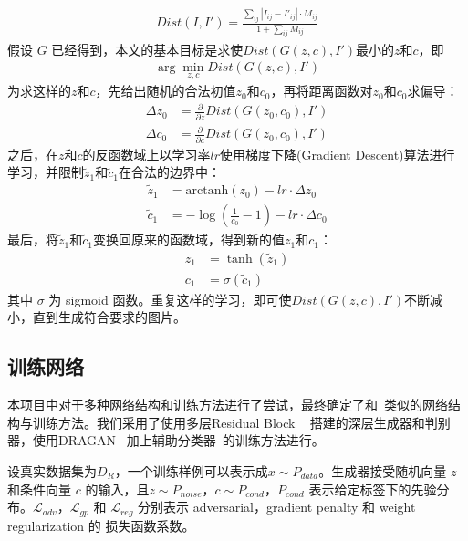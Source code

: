 \documentclass[a4paper,12pt,UTF8]{ctexart}
\begin{document}
\begin{align}
  Dist(I, I') = \frac{\sum_{ij} |I_{ij} - I'_{ij}| \cdot M_{ij}}{1 + \sum_{ij} M_{ij}}
\end{align}
%
假设 $G$ 已经得到，本文的基本目标是求使$Dist(G(z, c), I')$最小的$z$和$c$，即
%
\begin{align}
  \arg\min_{z, c} Dist(G(z, c), I')
\end{align}
%
为求这样的$z$和$c$，先给出随机的合法初值$z_{0}$和$c_{0}$，再将距离函数对$z_{0}$和$c_{0}$求偏导：
%
\begin{align}
  \Delta z_{0} & = \frac{\partial}{\partial z} Dist(G(z_{0}, c_{0}), I') \\
  \Delta c_{0} & = \frac{\partial}{\partial c} Dist(G(z_{0}, c_{0}), I')
\end{align}
%
之后，在$z$和$c$的反函数域上以学习率$lr$使用梯度下降(Gradient Descent)算法进行学习，并限制$\tilde z_{1}$和$\tilde c_{1}$在合法的边界中：
%
\begin{align}
  \tilde z_{1} & = \mathrm{arctanh}(z_{0}) - lr \cdot \Delta z_{0} \\
  \tilde c_{1} & = - \log \left(\frac{1}{c_{0}} - 1\right) - lr \cdot \Delta c_{0}
\end{align}
%
最后，将$\tilde z_{1}$和$\tilde c_{1}$变换回原来的函数域，得到新的值$z_{1}$和$c_{1}$：
%
\begin{align}
  z_{1} & = \tanh (\tilde z_{1}) \\
  c_{1} & = \sigma(\tilde c_{1})
\end{align}
%
其中 $\sigma$ 为 sigmoid 函数。重复这样的学习，即可使$Dist(G(z, c), I')$不断减小，直到生成符合要求的图片。

\subsection{训练网络}

本项目中对于多种网络结构和训练方法进行了尝试，最终确定了和~\cite{Jin2017Towards}类似的网络结构与训练方法。我们采用了使用多层Residual Block ~\cite{he2016deep} 搭建的深层生成器和判别器，使用DRAGAN ~\cite{kodali2017convergence}加上辅助分类器~\cite{odena2016conditional}的训练方法进行。

设真实数据集为$D_R$，一个训练样例可以表示成$x \sim P_{data}$。生成器接受随机向量 $z$ 和条件向量 $c$ 的输入，且$z \sim P_{noise}$，$c \sim P_{cond}$，$P_{cond}$ 表示给定标签下的先验分布。$\mathcal{L}_{adv}$，$\mathcal{L}_{gp}$ 和 $\mathcal{L}_{reg}$ 分别表示 adversarial，gradient penalty 和 weight regularization 的 损失函数系数。
\end{document}
